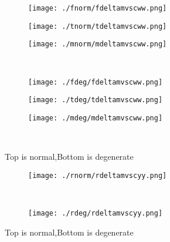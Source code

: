 \documentclass[aps,floats,floatfix,nofootinbib]{revtex4-1}
\begin{document}
\begin{center}
\begin{figure}
\begin{subfigure}{0.3\textwidth}
\texttt{[image: ./fnorm/fdeltamvscww.png]}
\label{}
\end{subfigure}
\begin{subfigure}{0.3\textwidth}
\texttt{[image: ./tnorm/tdeltamvscww.png]}
\label{}
\end{subfigure}
\begin{subfigure}{0.3\textwidth}
\texttt{[image: ./mnorm/mdeltamvscww.png]}
\label{}
\end{subfigure}\\
\begin{subfigure}{0.3\textwidth}
\texttt{[image: ./fdeg/fdeltamvscww.png]}
\label{}
\end{subfigure}
\begin{subfigure}{0.3\textwidth}
\texttt{[image: ./tdeg/tdeltamvscww.png]}
\label{}
\end{subfigure}
\begin{subfigure}{0.3\textwidth}
\texttt{[image: ./mdeg/mdeltamvscww.png]}
\label{}
\end{subfigure}\\
\caption{Top is normal,Bottom is degenerate}
\end{figure}
\end{center}

\begin{center}
\begin{figure}
\begin{subfigure}{0.95\textwidth}
\texttt{[image: ./rnorm/rdeltamvscyy.png]}
\label{}
\end{subfigure}\\
\begin{subfigure}{0.95\textwidth}
\texttt{[image: ./rdeg/rdeltamvscyy.png]}
\label{}
\end{subfigure}
\caption{Top is normal,Bottom is degenerate}
\end{figure}
\end{center}
\end{document}
